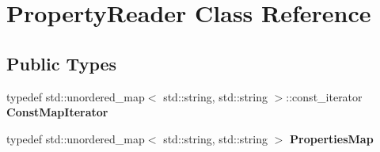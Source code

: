 \hypertarget{class_property_reader}{}\section{Property\+Reader Class Reference}
\label{class_property_reader}
\subsection*{Public Types}
\begin{DoxyCompactItemize}
\item 
\mbox{\label{class_property_reader_a67051897acc59f65ac0d460f05324217}} 
typedef std\+::unordered\+\_\+map$<$ std\+::string, std\+::string $>$\+::const\+\_\+iterator {\bfseries Const\+Map\+Iterator}
\item 
\mbox{\label{class_property_reader_a373361d650db94ac242ddc2d811dd34c}} 
typedef std\+::unordered\+\_\+map$<$ std\+::string, std\+::string $>$ {\bfseries Properties\+Map}
\end{DoxyCompactItemize}
